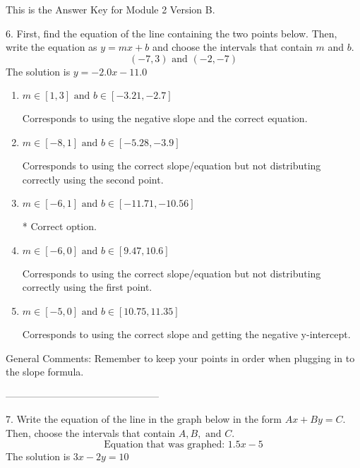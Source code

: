 \documentclass{article}[10pt]
\begin{document}
This is the Answer Key for Module 2 Version B.

6. First, find the equation of the line containing the two points below. Then, write the equation as $ y=mx+b $ and choose the intervals that contain $m$ and $b$.
$$ (-7, 3) \text{ and } (-2, -7) $$ 
The solution is $ y = -2.0 x - 11.0 $ 

\begin{enumerate}[label=\Alph*.] 
\item $ m \in [1, 3] \text{ and } b \in [-3.21, -2.7] $ 

  Corresponds to using the negative slope and the correct equation. 
\item $ m \in [-8, 1] \text{ and } b \in [-5.28, -3.9] $ 

  Corresponds to using the correct slope/equation but not distributing correctly using the second point. 
\item $ m \in [-6, 1] \text{ and } b \in [-11.71, -10.56] $ 

 * Correct option. 
\item $ m \in [-6, 0] \text{ and } b \in [9.47, 10.6] $ 

  Corresponds to using the correct slope/equation but not distributing correctly using the first point. 
\item $ m \in [-5, 0] \text{ and } b \in [10.75, 11.35] $ 

  Corresponds to using the correct slope and getting the negative y-intercept. 
\end{enumerate} 
 
General Comments: Remember to keep your points in order when plugging in to the slope formula.

-----------------------------------------------

7. Write the equation of the line in the graph below in the form $Ax+By=C$. Then, choose the intervals that contain $A, B, \text{ and } C$.
$$ \text{Equation that was graphed: } 1.5 x - 5 $$ 
The solution is $ 3 x - 2 y = 10 $ 
\end{document}
